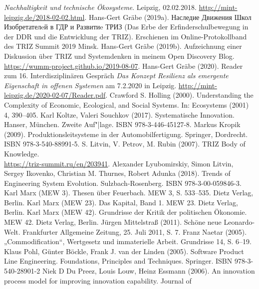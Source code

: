 \documentclass[11pt,a4paper]{article}
\begin{document}
\begin{thebibliography}{xxx}
  \emph{Nachhaltigkeit und technische Ökosysteme}. Leipzig, 02.02.2018. 
  \url{http://mint-leipzig.de/2018-02-02.html}.
 Hans-Gert Gräbe (2019a).
  \foreignlanguage{russian}{Наследие Движения Школ Изобретателeй в ГДР и
    Развитиe ТРИЗ} (Das Erbe der Erfinderschulbewegung in der DDR und die
  Entwicklung der TRIZ). Erschienen im Online-Protokollband des TRIZ Summit
  2019 Minsk.
 Hans-Gert Gräbe (2019b).  Aufzeichnung einer Diskussion
  über TRIZ und Systemdenken in meinem Open Discovery Blog.
  \url{https://wumm-project.github.io/2019-08-07}.
 Hans-Gert Gräbe (2020). Reader zum 16. Interdisziplinären
  Gespräch \emph{Das Konzept Resilienz als emergente Eigenschaft in offenen
    Systemen} am 7.2.2020 in Leipzig.
  \url{http://mint-leipzig.de/2020-02-07/Reader.pdf}.
 Crawford S. Holling (2000). Understanding the Complexity
  of Economic, Ecological, and Social Systems. In: Ecosystems (2001) 4,
  390–405.
 Karl Koltze, Valeri Souchkov (2017).  Systematische
  Innovation.\\ Hanser, München. Zweite Auf"|lage. ISBN 978-3-446-45127-8.
 Markus Kropik (2009). Produktionsleitsysteme in der
    Automobilfertigung. Springer, Dordrecht.\\ ISBN 978-3-540-88991-5.
 S. Litvin, V. Petrov, M. Rubin (2007). TRIZ Body of
  Knowledge. \\ \url{https://triz-summit.ru/en/203941}.
 Alexander Lyubomirskiy, Simon Litvin, Sergey Ikovenko,
  Christian M. Thurnes, Robert Adunka (2018). Trends of Engineering System
  Evolution. Sulzbach-Rosenberg.  ISBN 978-3-00-059846-3.
 Karl Marx (MEW 3).  Thesen über Feuerbach. MEW 3, S. 533--535.
  Dietz Verlag, Berlin.
 Karl Marx (MEW 23). Das Kapital, Band 1. MEW 23. Dietz Verlag,
  Berlin.
 Karl Marx (MEW 42). Grundrisse der Kritik der politischen
  Ökonomie.  MEW 42. Dietz Verlag, Berlin.
 Jürgen Mittelstraß (2011).  Schöne neue
  Leonardo-Welt.  Frankfurter Allgemeine Zeitung, 25. Juli 2011, S. 7.
 Franz Naetar (2005). „Commodification“, Wertgesetz und
  immaterielle Arbeit. Grundrisse 14, S. 6--19.
 Klaus Pohl, Günter Böckle, Frank J. van der Linden (2005).
  Software Product Line Engineering. Foundations, Principles and Techniques.
  Springer. ISBN 978-3-540-28901-2
 Niek D Du Preez, Louis Louw, Heinz Essmann (2006). An
  innovation process model for improving innovation capability.  Journal of

\end{thebibliography}
\end{document}
